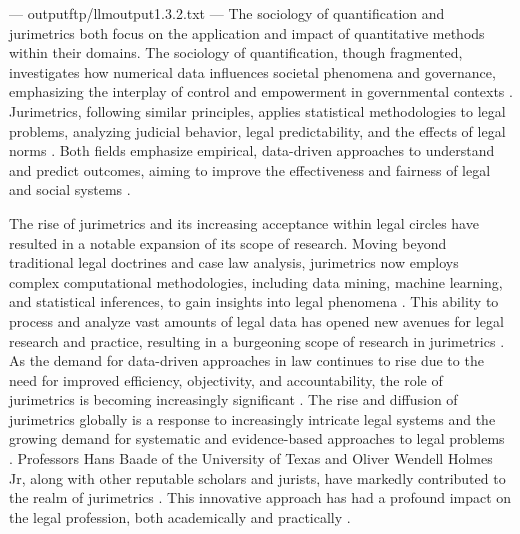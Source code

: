 ---
outputftp/llmoutput1.3.2.txt
---
The sociology of quantification and jurimetrics both focus on the application and impact of quantitative methods within their domains. The sociology of quantification, though fragmented, investigates how numerical data influences societal phenomena and governance, emphasizing the interplay of control and empowerment in governmental contexts \cite{demortain2019, paiva2021}. Jurimetrics, following similar principles, applies statistical methodologies to legal problems, analyzing judicial behavior, legal predictability, and the effects of legal norms \cite{nunes2018, loevinger1949}. Both fields emphasize empirical, data-driven approaches to understand and predict outcomes, aiming to improve the effectiveness and fairness of legal and social systems \cite{demortain2019, paiva2021, nunes2018, loevinger1949}.

The rise of jurimetrics and its increasing acceptance within legal circles have resulted in a notable expansion of its scope of research. Moving beyond traditional legal doctrines and case law analysis, jurimetrics now employs complex computational methodologies, including data mining, machine learning, and statistical inferences, to gain insights into legal phenomena \cite{losano2006}. This ability to process and analyze vast amounts of legal data has opened new avenues for legal research and practice, resulting in a burgeoning scope of research in jurimetrics \cite{losano2006}. As the demand for data-driven approaches in law continues to rise due to the need for improved efficiency, objectivity, and accountability, the role of jurimetrics is becoming increasingly significant \cite{losano2006}. The rise and diffusion of jurimetrics globally is a response to increasingly intricate legal systems and the growing demand for systematic and evidence-based approaches to legal problems \cite{brunaarmonascolombopedrobuckviniciusmianabezerra}. Professors Hans Baade of the University of Texas and Oliver Wendell Holmes Jr, along with other reputable scholars and jurists, have markedly contributed to the realm of jurimetrics \cite{1023071190721}. This innovative approach has had a profound impact on the legal profession, both academically and practically \cite{1023071190721}.

